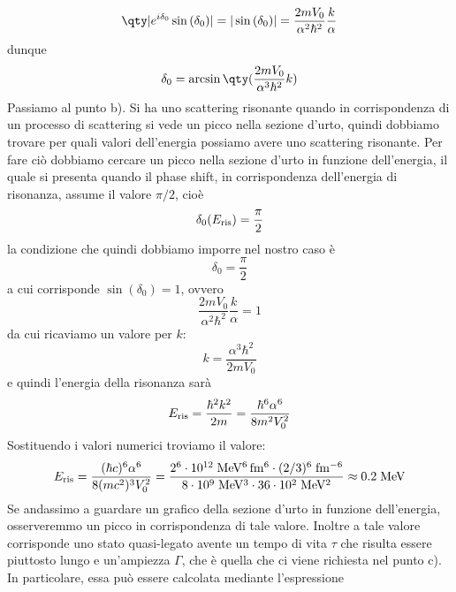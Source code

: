 \begin{soluzione}
   \begin{equation*}
      \qty| e^{i\delta_0} \sin{(\delta_0)} |
      =| \sin{(\delta_0)} |
      =\frac{2 m V_0}{\alpha^2 \hbar^2} \frac{k}{\alpha}
   \end{equation*}
   dunque
   \begin{equation}
      \delta_0
      =\arcsin{\qty( \frac{2 m V_0}{\alpha^3 \hbar^2} k )}
      \label{eq:delta_0_non_small}
   \end{equation}
   Passiamo al punto b). Si ha uno scattering risonante quando in corrispondenza di un processo di scattering si vede un picco nella sezione d'urto, quindi dobbiamo trovare per quali valori dell'energia possiamo avere uno scattering risonante. Per fare ciò dobbiamo cercare un picco nella sezione d'urto in funzione dell'energia, il quale si presenta quando il phase shift, in corrispondenza dell'energia di risonanza, assume il valore $\pi/2$, cioè
   \begin{equation*}
      \delta_0(E_{\rm ris})
      =\frac{\pi}{2}
   \end{equation*}
   la condizione che quindi dobbiamo imporre nel nostro caso è
   \begin{equation*}
      \delta_0=\frac{\pi}{2}
   \end{equation*}
   a cui corrisponde $\sin{(\delta_0)}=1$, ovvero
   \begin{equation*}
      \frac{2 m V_0}{\alpha^2 \hbar^2} \frac{k}{\alpha}
      =1
   \end{equation*}
   da cui ricaviamo un valore per $k$:
   \begin{equation*}
      k
      =\frac{\alpha^3 \hbar^2}{2 m V_0}
   \end{equation*}
   e quindi l'energia della risonanza sarà
   \begin{equation*}
      E_{\rm ris}
      =\frac{\hbar^2 k^2}{2m}
      =\frac{\hbar^6 \alpha^6}{8m^2 V_0^2}
   \end{equation*}
   Sostituendo i valori numerici troviamo il valore:
   \begin{equation*}
      E_{\rm ris}
      =\frac{(\hbar c)^6 \alpha^6}{8 (m c^2)^3 V_0^2}
      =\rm \frac{2^6 \cdot 10^{12} \; MeV^6 \, fm^6 \cdot (2/3)^6 \; fm^{-6}}{8 \cdot 10^9 \; MeV^3 \cdot 36 \cdot 10^2 \; MeV^2}
      \approx 0.2 \rm \; MeV
   \end{equation*}
   Se andassimo a guardare un grafico della sezione d'urto in funzione dell'energia, osserveremmo un picco in corrispondenza di tale valore. Inoltre a tale valore corrisponde uno stato quasi-legato avente un tempo di vita $\tau$ che risulta essere piuttosto lungo e un'ampiezza $\Gamma$, che è quella che ci viene richiesta nel punto c). In particolare, essa può essere calcolata mediante l'espressione

\end{soluzione}
